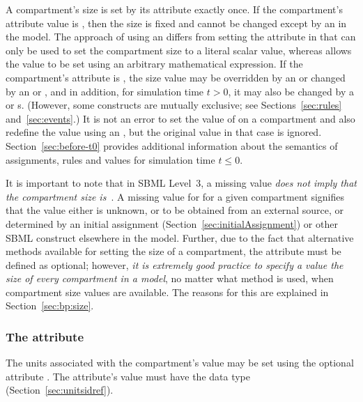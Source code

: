 A compartment's size is set by its  attribute exactly
once.  If the compartment's  attribute value is
, then the size is fixed and cannot be changed except by
an \InitialAssignment in the model.  The approach of using an
\InitialAssignment differs from setting the  attribute
in that  can only be used to set the compartment size
to a literal scalar value, whereas \InitialAssignment allows the
value to be set using an arbitrary mathematical expression.  If
the compartment's  attribute is , the
size value may be overridden by an \InitialAssignment or changed
by an \AssignmentRule or \AlgebraicRule, and in addition, for
simulation time $t > 0$, it may also be changed by a \RateRule or
\Event{}s.  (However, some constructs are mutually exclusive; see
Sections~\ref{sec:rules} and~\ref{sec:events}.)  It is not an
error to set the value of  on a compartment and also
redefine the value using an \InitialAssignment, but the original
 value in that case is ignored.
Section~\ref{sec:before-t0} provides additional information about
the semantics of assignments, rules and values for simulation time
$t \leq 0$.

It is important to note that in SBML Level~3, a missing
 value \emph{does not imply that the compartment size
  is~}. A missing value for  for a given
compartment signifies that the value either is unknown, or to be
obtained from an external source, or determined by an initial
assignment (Section~\ref{sec:initialAssignment}) or other SBML
construct elsewhere in the model.  Further, due to the fact that
alternative methods available for setting the size of a
compartment, the  attribute must be defined as
optional; however, \emph{it is extremely good practice to specify
  a value the size of every compartment in a model}, no matter
what method is used, when compartment size values are available.
The reasons for this are explained in Section~\ref{sec:bp:size}.


\subsubsection{The  attribute}
\label{sec:compartment-units}

The units associated with the compartment's  value may
be set using the optional \Compartment attribute .
The attribute's value must have the data type 
(Section~\ref{sec:unitsidref}).

